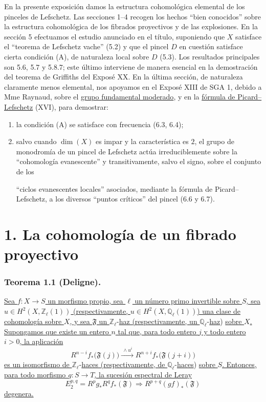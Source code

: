 En la presente exposición damos la estructura cohomológica elemental de los
pinceles de Lefschetz. Las secciones 1--4 recogen los hechos ``bien
conocidos'' sobre la estructura cohomológica de los fibrados proyectivos
y de las explosiones. En la sección 5 efectuamos el estudio anunciado
en el título, suponiendo que $X$ satisface el ``teorema de Lefschetz
vache'' (5.2) y que el pincel $D$ en cuestión satisface cierta condición
(A), de naturaleza local sobre $D$ (5.3). Los resultados principales
son 5.6, 5.7 y 5.8.7; este último interviene de manera esencial en la
demostración del teorema de Griffiths del Exposé XX. En la última
sección, de naturaleza claramente menos elemental, nos apoyamos en el
Exposé XIII de SGA 1, debido a Mme Raynaud, sobre el
\underline{grupo fundamental moderado}, y en la
\underline{fórmula de Picard--Lefschetz} (XVI), para demostrar:
\begin{enumerate}
\item[(1)] la condición (A) se satisface con frecuencia (6.3, 6.4);
\item[(2)] salvo cuando $\dim(X)$ es impar y la característica es $2$,
el grupo de monodromía de un pincel de Lefschetz actúa irreduciblemente
sobre la ``cohomología evanescente'' y transitivamente, salvo el signo,
sobre el conjunto de los

\pageoriginale

``ciclos evanescentes locales'' asociados, mediante la fórmula de
Picard--Lefschetz, a los diversos ``puntos críticos'' del pincel
(6.6 y 6.7).
\end{enumerate}

\section*{1. La cohomología de un fibrado proyectivo}

\subsubsection*{Teorema 1.1 (Deligne).}
\underline{Sea $f:X\longrightarrow S$ un morfismo propio, sea $\ell$ un
número primo invertible sobre $S$, sea
$u\in H^2(X,\mathbb Z_\ell(1))$ (respectivamente,
$u\in H^2(X,\mathbb Q_\ell(1))$) una clase de cohomología sobre $X$, y
sea $\mathfrak F$ un }$\mathbb Z_\ell$-\underline{haz (respectivamente, un
}$\mathbb Q_\ell$-\underline{haz}) \underline{sobre $X$. Supongamos que existe un entero $n$
tal que, para todo entero $j$ y todo entero $i>0$, la aplicación}
\begin{equation}\tag{1.1.1}
R^{n-i}f_*\bigl(\mathfrak F(j)\bigr)
\xrightarrow{\ \wedge u^i\ }
R^{n+i}f_*\bigl(\mathfrak F(j+i)\bigr)
\end{equation}
\underline{es un isomorfismo de }$\mathbb Z_\ell$-\underline{haces
(respectivamente, de }$\mathbb Q_\ell$-\underline{haces}) \underline{sobre $S$. Entonces, para
todo morfismo $g:S\longrightarrow T$, la sucesión espectral de Leray}
\[
E_2^{p,q}=R^pg_*R^qf_*(\mathfrak F)
\Longrightarrow R^{p+q}(gf)_*(\mathfrak F)
\]
\underline{degenera.}

